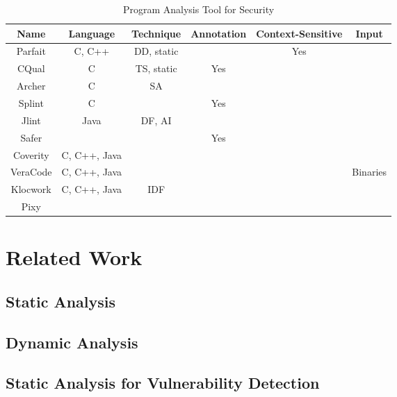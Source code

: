 \newcommand{\parfait}{\texttt{Parfait}\xspace}
\newcommand{\cqual}{\texttt{CQual}\xspace}

\begin{table*}[!htbp]
\centering
\begin{tabular}{|c|c|c|c|c|c|}
\hline
{\bf Name} & {\bf Language}	& {\bf Technique } &	{\bf Annotation}	& {\bf Context-Sensitive} & {\bf Input}  \\ \hline
Parfait	    &	C, C++		&	DD,	static		&						&	Yes					&							\\
CQual	 	&	C			&	TS, static		&	Yes					&						&   						\\
Archer	 	&	C			&	SA				&						&						&   						\\
Splint		&	C			&					&	Yes					&						&							\\
Jlint		&	Java		&	DF, AI			&						&						&							\\
Safer		&				&					&	Yes					&						&							\\
Coverity	& C, C++, Java  &					&						&						&							\\
VeraCode	& C, C++, Java  &					&						&						&	Binaries				\\
Klocwork	& C, C++, Java  &	IDF				&						&						&							\\
Pixy		&				&					&						&						&							\\ \hline
\end{tabular}\caption{Program Analysis Tool for Security}
\end{table*}

\section{Related Work}\label{sec:related}

\subsection{Static Analysis}

\cite{Engler:2000:CSR}

\subsection{Dynamic Analysis}

\subsection{Static Analysis for Vulnerability Detection}

